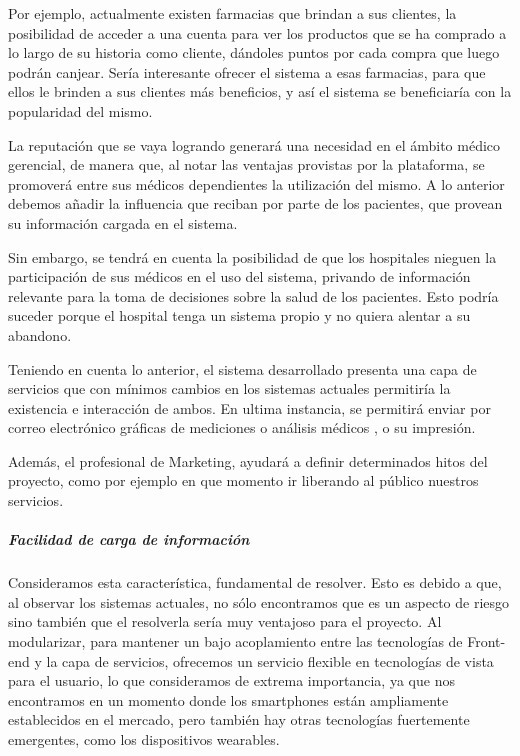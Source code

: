     Por ejemplo, actualmente existen farmacias que brindan a sus clientes, la posibilidad de acceder a una cuenta para ver los productos que se ha comprado a lo largo de su historia como cliente, dándoles puntos por cada compra que luego podrán canjear.
    Sería interesante ofrecer el sistema a esas farmacias, para que ellos le brinden a sus clientes más beneficios, y así el sistema se beneficiaría con la popularidad del mismo.
    
	La reputación que se vaya logrando generará una necesidad en el ámbito médico gerencial, de manera que, al notar las ventajas provistas por la plataforma, se promoverá entre sus médicos dependientes la utilización del mismo.
    A lo anterior debemos añadir la influencia que reciban por parte de los pacientes, que provean su información cargada en el sistema.
    
    Sin embargo, se tendrá en cuenta la posibilidad de que los hospitales nieguen la participación de sus médicos en el uso del sistema, privando de información relevante para la toma de decisiones sobre la salud de los pacientes.
    Esto podría suceder porque el hospital tenga un sistema propio y no quiera alentar a su abandono. 
    
    Teniendo en cuenta lo anterior, el sistema desarrollado presenta una capa de servicios que con mínimos cambios en los sistemas actuales permitiría la existencia e interacción de ambos.
    En ultima instancia, se permitirá enviar por correo electrónico gráficas de mediciones o análisis médicos , o su impresión.

    Además, el profesional de Marketing, ayudará a definir determinados hitos del proyecto, como por ejemplo en que momento ir liberando al público nuestros servicios.
    
    
\subparagraph{Facilidad de carga de información}
    
    Consideramos esta característica, fundamental de resolver.
    Esto es debido a que, al observar los sistemas actuales, no sólo encontramos que es un aspecto de riesgo sino también que el resolverla sería muy ventajoso para el proyecto. 
    Al modularizar, para mantener un bajo acoplamiento entre las tecnologías de Front-end y la capa de servicios, ofrecemos un servicio flexible en tecnologías de vista para el usuario, lo que consideramos de extrema importancia, ya que nos encontramos en un momento donde los smartphones están ampliamente establecidos en el mercado, pero también hay otras tecnologías fuertemente emergentes, como los dispositivos wearables.
    
